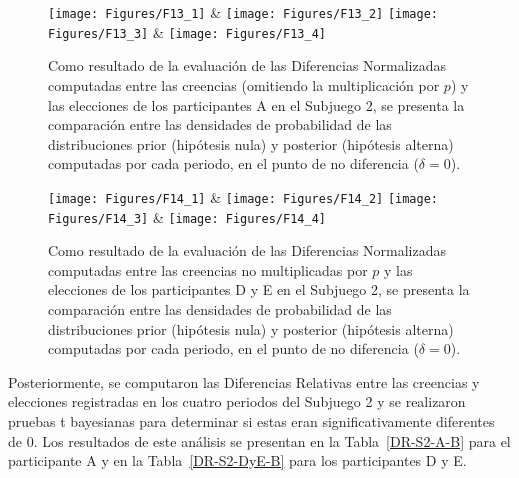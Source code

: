 \begin{figure}[h]
\centering
\texttt{[image: Figures/F13\_1]} & \texttt{[image: Figures/F13\_2]} 
\texttt{[image: Figures/F13\_3]} & \texttt{[image: Figures/F13\_4]} 
\decoRule
\caption[Evaluación de las Diferencias Normalizadas entre creencias (sin multiplicar por $p$) y elecciones en los participantes A en el Subjuego 2 (Factor de Bayes)]{Como resultado de la evaluación de las Diferencias Normalizadas computadas entre las creencias (omitiendo la multiplicación por $p$) y las elecciones de los participantes A en el Subjuego 2, se presenta la comparación entre las densidades de probabilidad de las distribuciones prior (hipótesis nula) y posterior (hipótesis alterna) computadas por cada periodo, en el punto de no diferencia ($\delta = 0$).}
\label{fig:DNnop_S2_A}
\end{figure}  


\begin{figure}[h]
\centering
\texttt{[image: Figures/F14\_1]} & \texttt{[image: Figures/F14\_2]} 
\texttt{[image: Figures/F14\_3]} & \texttt{[image: Figures/F14\_4]} 
\decoRule
\caption[Evaluación de las Diferencias Normalizadas entre creencias y elecciones en los participantes D y E en el Subjuego 2 (Factor de Bayes)]{Como resultado de la evaluación de las Diferencias Normalizadas computadas entre las creencias no multiplicadas por $p$ y las elecciones de los participantes D y E en el Subjuego 2, se presenta la comparación entre las densidades de probabilidad de las distribuciones prior (hipótesis nula) y posterior (hipótesis alterna) computadas por cada periodo, en el punto de no diferencia ($\delta = 0$).}
\label{fig:DNnop_S2_DyE}
\end{figure}  

Posteriormente, se computaron las Diferencias Relativas entre las creencias y elecciones registradas en los cuatro periodos del Subjuego 2 y se realizaron pruebas t bayesianas para determinar si estas eran significativamente diferentes de 0. Los resultados de este análisis se presentan en la Tabla~\ref{DR-S2-A-B} para el participante A y en la Tabla~\ref{DR-S2-DyE-B} para los participantes D y E.\\

